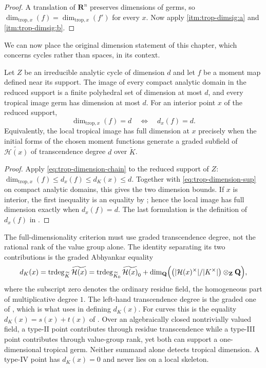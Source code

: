 \begin{proof}
A translation of $\mathbf R^n$ preserves dimensions of germs, so
$\dim_{\mathrm{trop},x}(f)=\dim_{\mathrm{trop},x}(f')$ for every $x$. Now
apply  \cref{itm:trop-dimsig:a} and
\cref{itm:trop-dimsig:b}.
\end{proof}

We can now place the original dimension statement of this chapter, which
concerns cycles rather than spaces, in its context.

\begin{proposition}
\label{prop:analytic-tropical-dimension}
Let $Z$ be an irreducible analytic cycle of dimension $d$ and let $f$ be a
moment map defined near its support. The image of every compact analytic
domain in the reduced support is a finite polyhedral set of dimension at
most $d$, and every tropical image germ has dimension at most $d$.
For an interior point $x$ of the reduced support,
\[
 \dim_{\mathrm{trop},x}(f)=d
 \quad\Longleftrightarrow\quad
 d_x(f)=d.
\]
Equivalently, the local tropical image has full dimension at $x$ precisely
when the initial forms of the chosen moment functions generate a graded
subfield of $\widetilde{\mathcal H(x)}$ of transcendence degree $d$ over
$\widetilde K$.
\end{proposition}
\begin{proof}
Apply \eqref{eq:trop-dimension-chain} to the reduced support of $Z$:
$\dim_{\mathrm{trop},x}(f)\le d_x(f)\le d_K(x)\le d$.  Together with
\eqref{eq:trop-dimension-sup} on compact analytic domains, this gives the
two dimension bounds. If $x$ is interior, the first inequality
is an equality by ; hence the local image has full
dimension exactly when $d_x(f)=d$. The last formulation is the definition of
$d_x(f)$ in .
\end{proof}

\begin{remark}
\label{rem:trop-dimension-two-halves}
The full-dimensionality criterion must use graded transcendence degree, not
the rational rank of the value group alone. The identity separating its two
contributions is the graded
Abhyankar equality
\[
 d_K(x)=\operatorname{trdeg}_{\widetilde K}\widetilde{\mathcal H(x)}
 =\operatorname{trdeg}_{\widetilde K_0}\widetilde{\mathcal H(x)}_0
 +\dim_{\mathbf Q}\Bigl(\bigl(|\mathcal H(x)^\times|/|K^\times|\bigr)
 \otimes_{\mathbf Z}\mathbf Q\Bigr),
\]
where the subscript zero denotes the ordinary residue field, the homogeneous
part of multiplicative degree $1$. The left-hand transcendence degree is the graded one of
, which is what
 uses in defining $d_K(x)$. For curves this is
the equality $d_K(x)=s(x)+t(x)$ of
. Over an algebraically closed nontrivially
valued field, a type-II point contributes through residue
transcendence while a type-III point contributes through value-group rank,
yet both can support a one-dimensional tropical germ. Neither summand alone
detects tropical dimension. A type-IV point has $d_K(x)=0$ and never lies on a
local skeleton.
\end{remark}

